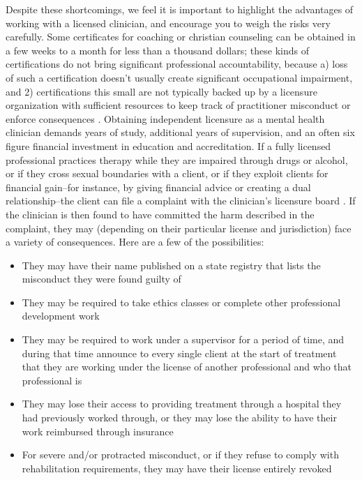 \documentclass[12pt,letterpaper]{book}
\begin{document}
Despite these shortcomings, we feel it is important to highlight the advantages of working with a licensed clinician, and encourage you to weigh the risks very carefully. Some certificates for coaching or christian counseling can be obtained in a few weeks to a month for less than a thousand dollars; these kinds of certifications do not bring significant professional accountability, because a) loss of such a certification doesn't usually create significant occupational impairment, and 2) certifications this small are not typically backed up by a licensure organization with sufficient resources to keep track of practitioner misconduct or enforce consequences \cite{carr2015end}. Obtaining independent licensure as a mental health clinician demands years of study, additional years of supervision, and an often six figure financial investment in education and accreditation. If a fully licensed professional practices therapy while they are impaired through drugs or alcohol, or if they cross sexual boundaries with a client, or if they exploit clients for financial gain--for instance, by giving financial advice or creating a dual relationship--the client can file a complaint with the clinician's licensure board \cite{vinson1987complaintProcedures,barsky2023licensing}. If the clinician is then found to have committed the harm described in the complaint, they may (depending on their particular license and jurisdiction) face a variety of consequences. Here are a few of the possibilities:
\begin{itemize}
    \item They may have their name published on a state registry that lists the misconduct they were found guilty of
    \item They may be required to take ethics classes or complete other professional development work
    \item They may be required to work under a supervisor for a period of time, and during that time announce to every single client at the start of treatment that they are working under the license of another professional and who that professional is
    \item They may lose their access to providing treatment through a hospital they had previously worked through, or they may lose the ability to have their work reimbursed through insurance 
    \item For severe and/or protracted misconduct, or if they refuse to comply with rehabilitation requirements, they may have their license entirely revoked
\end{itemize}
\end{document}
